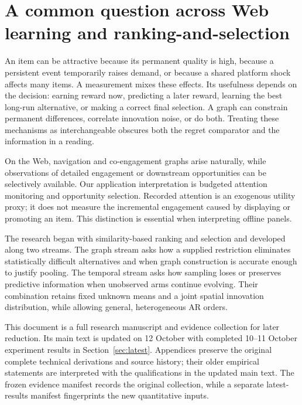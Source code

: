 \section{A common question across Web learning and ranking-and-selection}

An item can be attractive because its permanent quality is high, because a persistent event temporarily raises demand, or because a shared platform shock affects many items. A measurement mixes these effects. Its usefulness depends on the decision: earning reward now, predicting a later reward, learning the best long-run alternative, or making a correct final selection. A graph can constrain permanent differences, correlate innovation noise, or do both. Treating these mechanisms as interchangeable obscures both the regret comparator and the information in a reading.

On the Web, navigation and co-engagement graphs arise naturally, while observations of detailed engagement or downstream opportunities can be selectively available. Our application interpretation is budgeted attention monitoring and opportunity selection. Recorded attention is an exogenous utility proxy; it does not measure the incremental engagement caused by displaying or promoting an item. This distinction is essential when interpreting offline panels.

The research began with similarity-based ranking and selection and developed along two streams. The graph stream asks how a supplied restriction eliminates statistically difficult alternatives and when graph construction is accurate enough to justify pooling. The temporal stream asks how sampling loses or preserves predictive information when unobserved arms continue evolving. Their combination retains fixed unknown means and a joint spatial innovation distribution, while allowing general, heterogeneous AR orders.

This document is a full research manuscript and evidence collection for later reduction. Its main text is updated on 12 October with completed 10--11 October experiment results in Section~\ref{sec:latest}. Appendices preserve the original complete technical derivations and source history; their older empirical statements are interpreted with the qualifications in the updated main text. The frozen evidence manifest records the original collection, while a separate latest-results manifest fingerprints the new quantitative inputs.

